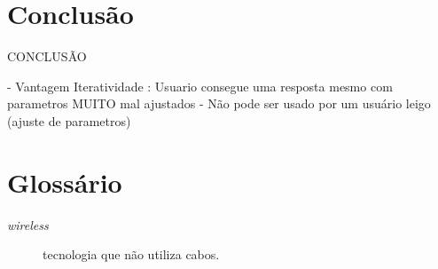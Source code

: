\documentclass[tc,twoside]{iiufrgs}
\begin{document}
\chapter{Conclusão} 

CONCLUSÃO

- Vantagem Iteratividade : Usuario consegue uma resposta mesmo com parametros MUITO mal ajustados
- Não pode ser usado por um usuário leigo (ajuste de parametros)



 

\chapter*{Glossário} 

\begin{description} 
	\item[\textit{wireless}] tecnologia que não utiliza cabos.
\end{description} 


\end{document}
